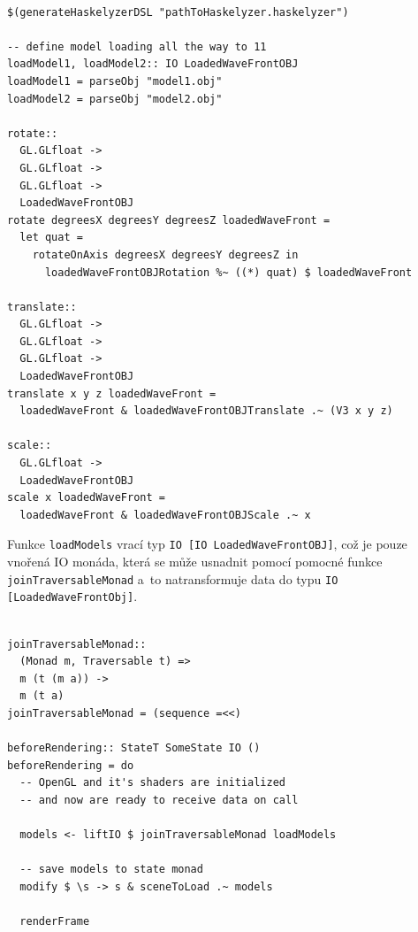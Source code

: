 \documentclass[male, czech]{kithesis}
\newenvironment{code}{\captionsetup{type=listing}}{}
\newcommand{\haskellInline}[1]{\colorbox{gray!10}{\texttt{#1}}}
\begin{document}
\begin{code}
\begin{verbatim}

$(generateHaskelyzerDSL "pathToHaskelyzer.haskelyzer")

-- define model loading all the way to 11
loadModel1, loadModel2:: IO LoadedWaveFrontOBJ
loadModel1 = parseObj "model1.obj"
loadModel2 = parseObj "model2.obj"

rotate:: 
  GL.GLfloat -> 
  GL.GLfloat -> 
  GL.GLfloat -> 
  LoadedWaveFrontOBJ
rotate degreesX degreesY degreesZ loadedWaveFront = 
  let quat = 
    rotateOnAxis degreesX degreesY degreesZ in 
      loadedWaveFrontOBJRotation %~ ((*) quat) $ loadedWaveFront 

translate:: 
  GL.GLfloat -> 
  GL.GLfloat -> 
  GL.GLfloat -> 
  LoadedWaveFrontOBJ
translate x y z loadedWaveFront = 
  loadedWaveFront & loadedWaveFrontOBJTranslate .~ (V3 x y z)
      
scale:: 
  GL.GLfloat -> 
  LoadedWaveFrontOBJ
scale x loadedWaveFront = 
  loadedWaveFront & loadedWaveFrontOBJScale .~ x

\end{verbatim}
\end{code}

Funkce \haskellInline{loadModels} vrací typ \haskellInline{IO [IO LoadedWaveFrontOBJ]},
což je pouze vnořená IO monáda, 
která se může usnadnit pomocí pomocné funkce \haskellInline{joinTraversableMonad}
a~to natransformuje data do typu \haskellInline{IO [LoadedWaveFrontObj]}.

\begin{code}
\begin{verbatim}

joinTraversableMonad:: 
  (Monad m, Traversable t) => 
  m (t (m a)) -> 
  m (t a)
joinTraversableMonad = (sequence =<<)

beforeRendering:: StateT SomeState IO ()
beforeRendering = do
  -- OpenGL and it's shaders are initialized 
  -- and now are ready to receive data on call

  models <- liftIO $ joinTraversableMonad loadModels 

  -- save models to state monad
  modify $ \s -> s & sceneToLoad .~ models

  renderFrame

\end{verbatim}
\end{code}
\end{document}
